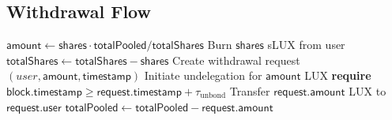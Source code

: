 \subsection{Withdrawal Flow}

\begin{algorithm}[H]
\caption{sLUX Withdrawal}
\label{alg:withdraw}
\begin{algorithmic}[1]
    \State $\mathsf{amount} \gets \mathsf{shares} \cdot \mathsf{totalPooled} / \mathsf{totalShares}$
    \State Burn $\mathsf{shares}$ sLUX from user
    \State $\mathsf{totalShares} \gets \mathsf{totalShares} - \mathsf{shares}$
    \State Create withdrawal request $(user, \mathsf{amount}, \mathsf{timestamp})$
    \State Initiate undelegation for $\mathsf{amount}$ LUX
\EndProcedure
{}
    \State \textbf{require} $\mathsf{block.timestamp} \geq \mathsf{request.timestamp} + \tau_{\text{unbond}}$
    \State Transfer $\mathsf{request.amount}$ LUX to $\mathsf{request.user}$
    \State $\mathsf{totalPooled} \gets \mathsf{totalPooled} - \mathsf{request.amount}$
\EndProcedure
\end{algorithmic}
\end{algorithm}

